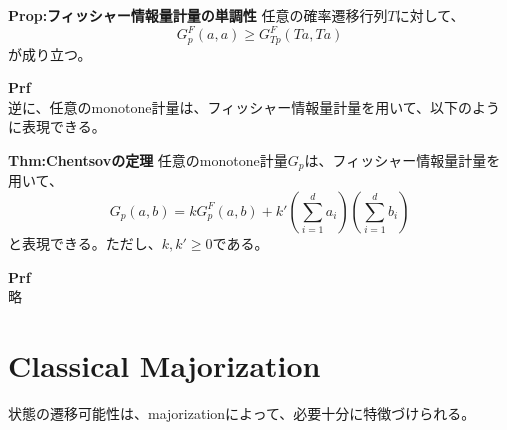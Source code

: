 \documentclass[a4paper,11pt]{jsarticle}
\numberwithin{equation}{section}
\begin{document}
\begin{itembox}[l]{\textbf{Prop:フィッシャー情報量計量の単調性}}
    任意の確率遷移行列$T$に対して、
    \begin{equation}
        G_p^F (a,a) \geq G_{Tp}^F (Ta,Ta)
    \end{equation}
    が成り立つ。
\end{itembox}
\textbf{Prf}\\

逆に、任意のmonotone計量は、フィッシャー情報量計量を用いて、以下のように表現できる。\\
\begin{itembox}[l]{\textbf{Thm:Chentsovの定理}}
    任意のmonotone計量$G_p$は、フィッシャー情報量計量を用いて、
    \begin{equation}
        G_p(a,b) = kG_p^F (a,b)+k'(\sum_{i=1}^{d}a_i)(\sum_{i=1}^{d}b_i)
    \end{equation}
    と表現できる。ただし、$k,k' \geq 0$である。
\end{itembox}
\textbf{Prf}\\
略\\
\newpage
\section{Classical Majorization}
状態の遷移可能性は、majorizationによって、必要十分に特徴づけられる。\\
\end{document}
